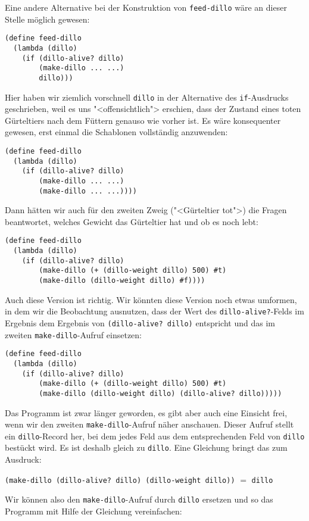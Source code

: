 Eine andere Alternative bei der Konstruktion von \lstinline{feed-dillo}
wäre an dieser Stelle möglich gewesen:
%
\begin{lstlisting}
(define feed-dillo
  (lambda (dillo)
    (if (dillo-alive? dillo)
        (make-dillo ... ...)
        dillo)))
\end{lstlisting}
%
Hier haben wir ziemlich vorschnell \lstinline{dillo} in der Alternative des
\lstinline{if}-Ausdrucks geschrieben, weil es uns "<offensichtlich"> erschien, dass
der Zustand eines toten Gürteltiers nach dem Füttern genauso wie
vorher ist.  Es wäre konsequenter gewesen, erst einmal die Schablonen
vollständig anzuwenden:
%
\begin{lstlisting}
(define feed-dillo
  (lambda (dillo)
    (if (dillo-alive? dillo)
        (make-dillo ... ...)
        (make-dillo ... ...))))
\end{lstlisting}
%
Dann hätten wir auch für den zweiten Zweig ("<Gürteltier tot">) die Fragen beantwortet,
welches Gewicht das Gürteltier hat und ob es noch lebt:
%
\begin{lstlisting}
(define feed-dillo
  (lambda (dillo)
    (if (dillo-alive? dillo)
        (make-dillo (+ (dillo-weight dillo) 500) #t)
        (make-dillo (dillo-weight dillo) #f))))
\end{lstlisting}
%
Auch diese Version ist richtig.  Wir könnten diese Version noch etwas
umformen, in dem wir die Beobachtung ausnutzen, dass der Wert des
\lstinline{dillo-alive?}-Felds im Ergebnis dem Ergebnis von
\lstinline{(dillo-alive? dillo)} entspricht und das im zweiten
\lstinline{make-dillo}-Aufruf einsetzen:
%
\begin{lstlisting}
(define feed-dillo
  (lambda (dillo)
    (if (dillo-alive? dillo)
        (make-dillo (+ (dillo-weight dillo) 500) #t)
        (make-dillo (dillo-weight dillo) (dillo-alive? dillo)))))
\end{lstlisting}
%
Das Programm ist zwar länger geworden, es gibt aber auch eine Einsicht
frei, wenn wir den zweiten \lstinline{make-dillo}-Aufruf näher anschauen.
Dieser Aufruf stellt ein \lstinline{dillo}-Record her, bei dem jedes Feld
aus dem entsprechenden Feld von \lstinline{dillo} bestückt wird.  Es ist
deshalb gleich zu \lstinline{dillo}.  Eine Gleichung bringt das zum Ausdruck:
%
\begin{center}
  \lstinline{(make-dillo (dillo-alive? dillo) (dillo-weight dillo))} $=$ \lstinline{dillo}
\end{center}
%
Wir können also den \lstinline{make-dillo}-Aufruf durch \lstinline{dillo}
ersetzen und so das Programm mit Hilfe der Gleichung vereinfachen:
